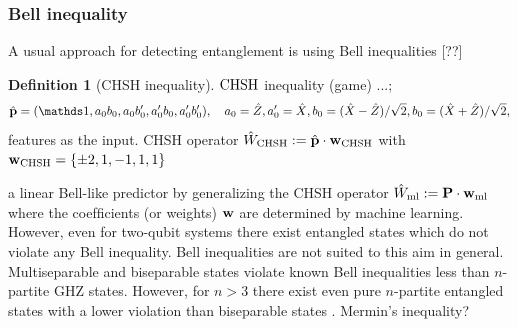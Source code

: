 \documentclass[
aps,
pra,
floatfix,
]{revtex4-2}
\theoremstyle{plain}
\theoremstyle{definition}
\newtheorem{definition}{Definition}
\newtheorem{remark}{Remark}
\newcommand{\ew}{\hat{W}}
\newcommand{\chsh}{\textup{CHSH}}
\begin{document}
\subsubsection{Bell inequality}
A usual approach for detecting entanglement is using Bell inequalities [??]
\begin{definition}[CHSH inequality]\label{def:chsh_inequality}
	$\chsh$ inequality (game) ...; 
	\begin{equation}
		\hat{\vb{p}}=
		\qty(\identity, a_0 b_0, a_0 b_0', a_0' b_0, a_0' b_0' )
		,\quad
		a_0 = \pz, a_0' = \px, 
		b_0 = (\px-\pz)/\sqrt{2},
		b_0 = (\px+\pz)/\sqrt{2},
	\end{equation}
	features as the input.
	CHSH operator $\ew_{\chsh}:=\hat{\vb{p}}\cdot\vb{w}_{\chsh}$ with 
	$\vb{w}_{\chsh} = \qty{\pm 2, 1, -1, 1, 1}$
\end{definition}
a linear Bell-like predictor by generalizing the CHSH operator $\ew_{\text{ml}}:=\vb{P}\cdot\vb{w}_{\text{ml}}$
where the coefﬁcients (or weights) $\vb{w}$ are determined by machine learning.
However, even for two-qubit systems there exist entangled states which do not violate any Bell inequality.
Bell inequalities are not suited to this aim in general. Multiseparable and biseparable states violate known Bell inequalities less than $n$-partite GHZ states. However, for $n > 3$ there exist even pure $n$-partite entangled states with a lower violation than biseparable states \cite{bourennaneWitnessingMultipartiteEntanglement2004}. 
Mermin's inequality?
\end{document}
